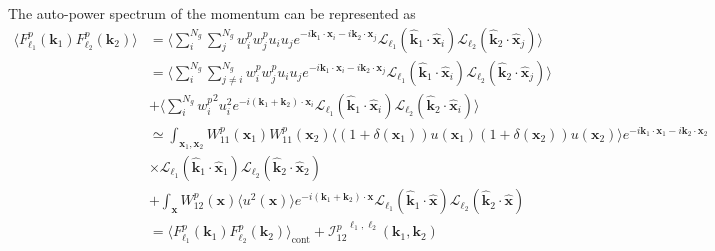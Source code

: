 \documentclass[a4paper,11pt]{article}
\begin{document}

The auto-power spectrum of the momentum can be represented as
\begin{align}
    \langle F^p_{\ell_1}(\boldsymbol{k}_1) F^p_{\ell_2}(\boldsymbol{k}_2)\rangle
    &= \langle \sum_i^{N_g}\sum_j^{N_g} w_i^p w_j^p u_i u_j e^{-i\boldsymbol{k}_1\cdot\boldsymbol{x}_i-i\boldsymbol{k}_2\cdot\boldsymbol{x}_j}
    \mathcal{L}_{\ell_1}(\hat{\boldsymbol{k}}_1\cdot\hat{\boldsymbol{x}}_i) \mathcal{L}_{\ell_2}(\hat{\boldsymbol{k}}_2\cdot\hat{\boldsymbol{x}}_j) \rangle \nonumber \\
    &= \langle\sum_i^{N_g}\sum_{j\neq i}^{N_g} w_i^p w_j^p u_i u_j e^{-i\boldsymbol{k}_1\cdot\boldsymbol{x}_i-i\boldsymbol{k}_2\cdot\boldsymbol{x}_j}
    \mathcal{L}_{\ell_1}(\hat{\boldsymbol{k}}_1\cdot\hat{\boldsymbol{x}}_i) \mathcal{L}_{\ell_2}(\hat{\boldsymbol{k}}_2\cdot\hat{\boldsymbol{x}}_j) \rangle \nonumber \\
    &+\langle\sum_i^{N_g} {w_i^p}^2 u_i^2 e^{-i(\boldsymbol{k}_1+\boldsymbol{k}_2)\cdot\boldsymbol{x}_i}
    \mathcal{L}_{\ell_1}(\hat{\boldsymbol{k}}_1\cdot\hat{\boldsymbol{x}}_i) \mathcal{L}_{\ell_2}(\hat{\boldsymbol{k}}_2\cdot\hat{\boldsymbol{x}}_i) \rangle \nonumber \\
    &\simeq \int_{\boldsymbol{x}_1, \boldsymbol{x}_2} W^p_{11}(\boldsymbol{x}_1) W^p_{11}(\boldsymbol{x}_2) \langle (1+\delta(\boldsymbol{x}_1))u(\boldsymbol{x}_1) (1+\delta(\boldsymbol{x}_2))u(\boldsymbol{x}_2)\rangle
    e^{-i\boldsymbol{k}_1\cdot\boldsymbol{x}_1-i\boldsymbol{k}_2\cdot\boldsymbol{x}_2} \\
    & \times \mathcal{L}_{\ell_1}(\hat{\boldsymbol{k}}_1\cdot\hat{\boldsymbol{x}}_1) \mathcal{L}_{\ell_2}(\hat{\boldsymbol{k}}_2\cdot\hat{\boldsymbol{x}}_2) \nonumber \\
    &+ \int_{\boldsymbol{x}} W^p_{12}(\boldsymbol{x})\langle u^2(\boldsymbol{x})\rangle e^{-i(\boldsymbol{k}_1+\boldsymbol{k}_2)\cdot\boldsymbol{x}}
    \mathcal{L}_{\ell_1}(\hat{\boldsymbol{k}}_1\cdot\hat{\boldsymbol{x}})
    \mathcal{L}_{\ell_2}(\hat{\boldsymbol{k}}_2\cdot\hat{\boldsymbol{x}}) \nonumber \\
    & = \langle F^p_{\ell_1}(\boldsymbol{k}_1) F^p_{\ell_2}(\boldsymbol{k}_2) \rangle_{\mathrm{cont}} + {\mathcal{I}_{12}^p}^{\ell_1, \ell_2} (\boldsymbol{k}_1, \boldsymbol{k}_2)
\end{align}
\end{document}
